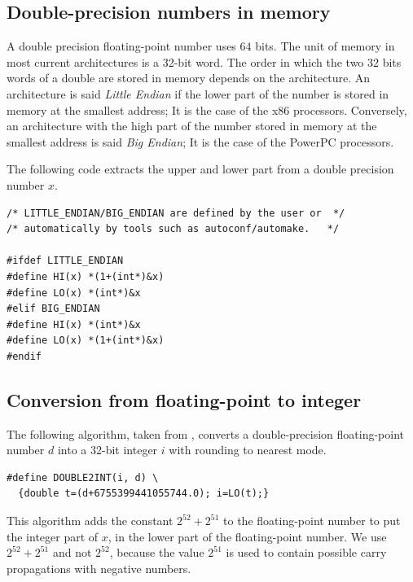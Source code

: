 \subsection{Double-precision numbers in memory\label{section:memory}}

A double precision floating-point number uses $64$ bits. The unit of memory in most current
architectures is a 32-bit word. The
order in which the two $32$ bits words of a double are stored in memory  depends on
the architecture. An architecture is said \emph{Little Endian} if the
lower part of the number is stored in memory at the smallest address;
It is the case of the x86 processors. Conversely, an architecture
with the high part of the number stored in memory at the smallest
address is said \emph{Big Endian}; It is the case of the PowerPC
processors.


The following code extracts the upper and lower part from a double
precision number $x$.

\begin{lstlisting}[label={chap0:lst:endian},
  caption={Extract upper and lower part of a double precision number $x$},firstnumber=1]
/* LITTLE_ENDIAN/BIG_ENDIAN are defined by the user or  */
/* automatically by tools such as autoconf/automake.   */

#ifdef LITTLE_ENDIAN
#define HI(x) *(1+(int*)&x)
#define LO(x) *(int*)&x
#elif BIG_ENDIAN
#define HI(x) *(int*)&x
#define LO(x) *(1+(int*)&x)
#endif
\end{lstlisting}



\subsection{Conversion from floating-point to integer}

\begin{theorem}
  The following algorithm, taken from \cite{AMDoptim2001}, converts a
  double-precision floating-point number $d$ into a 32-bit
  integer $i$ with rounding to nearest mode.
\begin{lstlisting}[label={chap0:lst:conversion2},caption={Conversion from FP to int},firstnumber=1]
#define DOUBLE2INT(i, d) \
  {double t=(d+6755399441055744.0); i=LO(t);}
\end{lstlisting}
\end{theorem}
This algorithm adds the constant $2^{52}+2^{51}$ to the floating-point
number to put the integer part of $x$, in the lower part of the
floating-point number.  We use $2^{52}+2^{51}$ and not $2^{52}$,
because the value $2^{51}$ is used to contain possible carry
propagations with negative numbers.



